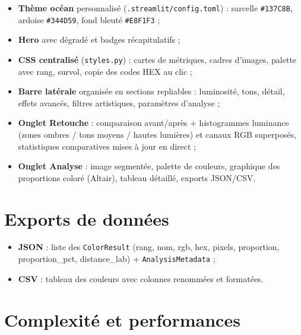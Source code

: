 \documentclass[11pt,a4paper]{article}
\begin{document}
\begin{itemize}
  \item \textbf{Thème océan} personnalisé (\texttt{.streamlit/config.toml})
        : sarcelle \texttt{\#137C8B}, ardoise \texttt{\#344D59}, fond
        bleuté \texttt{\#E8F1F3} ;
  \item \textbf{Hero} avec dégradé et badges récapitulatifs ;
  \item \textbf{CSS centralisé} (\texttt{styles.py}) : cartes de métriques,
        cadres d'images, palette avec rang, survol, copie des codes HEX au
        clic ;
  \item \textbf{Barre latérale} organisée en sections repliables :
        luminosité, tons, détail, effets avancés, filtres artistiques,
        paramètres d'analyse ;
  \item \textbf{Onglet Retouche} : comparaison avant/après + histogrammes
        luminance (zones ombres / tons moyens / hautes lumières) et canaux
        RGB superposés, statistiques comparatives mises à jour en direct ;
  \item \textbf{Onglet Analyse} : image segmentée, palette de couleurs,
        graphique des proportions coloré (Altair), tableau détaillé,
        exports JSON/CSV.
\end{itemize}

\section{Exports de données}

\begin{itemize}
  \item \textbf{JSON} : liste des \texttt{ColorResult} (rang, nom, rgb,
        hex, pixels, proportion, proportion\_pct, distance\_lab) +
        \texttt{AnalysisMetadata} ;
  \item \textbf{CSV} : tableau des couleurs avec colonnes renommées et
        formatées.
\end{itemize}

\section{Complexité et performances}
\end{document}
